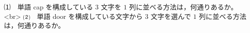 ⑴　単語 cap を構成している $3$ 文字を $1$ 列に並べる方法は，何通りあるか。 <br>
⑵　単語 door を構成している文字から $3$ 文字を選んで $1$ 列に並べる方法は，何通りあるか。
